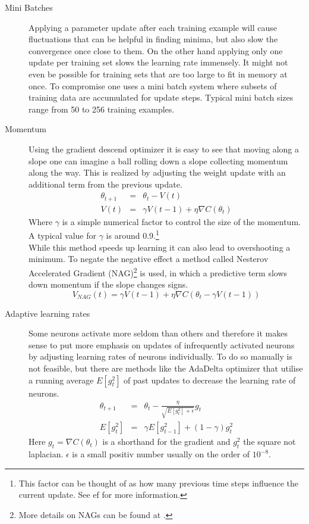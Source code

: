 				\begin{description}
					\item[Mini Batches] Applying a parameter update after each training example will cause fluctuations that can be helpful in finding minima, but also slow the convergence once close to them. On the other hand applying only one update per training set slows the learning rate immensely. It might not even be possible for training sets that are too large to fit in memory at once. To compromise one uses a mini batch system where subsets of training data are accumulated for update steps. Typical mini batch sizes range from 50 to 256 training examples.
					\item[Momentum] Using the gradient descend optimizer it is easy to see that moving along a slope one can imagine a ball rolling down a slope collecting momentum along the way. This is realized by adjusting the weight update with an additional term from the previous update.
					\begin{eqnarray}
						\theta_{t+1} & = & \theta_t - V(t)\\
						V(t) & = & \gamma V(t-1)  + \eta \nabla C(\theta_{t})
					\end{eqnarray}
					Where $\gamma$ is a simple numerical factor to control the size of the momentum. A typical value for $\gamma$ is around $0.9$.\footnote{This factor can be thought of as how many previous time steps influence the current update. See \cite{NNSGD}ef  for more information.}\\
					While this method speeds up learning  it can also lead to overshooting a minimum. To negate the negative effect a method called Nesterov Accelerated Gradient (NAG)\footnote{More details on NAGs can be found at \cite{NNNAG}.} is used, in which a predictive term slows down momentum if the slope changes signs.
					\begin{equation}
						V_{NAG}(t) = \gamma V(t-1) + \eta \nabla C( \theta_t - \gamma V(t-1))
					\end{equation} 
					\item[Adaptive learning rates] Some neurons activate more seldom than others and therefore it makes sense to put more emphasis on updates of infrequently activated neurons by adjusting learning rates of neurons individually. To do so manually is not feasible, but there are methods like the AdaDelta optimizer that utilise a running average $E[g^2_t]$ of past updates to decrease the learning rate of neurons.
					\begin{eqnarray}
					\theta_{t+1} & = & \theta_t - \frac{\eta}{\sqrt{E[g^2_t]+\epsilon}}g_t \\
					E[g^2_t] & = & \gamma E[g^2_{t-1}] + (1-\gamma) g^2_t
					\end{eqnarray}
					Here $g_t = \nabla C(\theta_t)$ is a shorthand for the gradient and $g^2_t$ the square not laplacian. $\epsilon$ is a small positiv number usually on the order of $10^{-8}$.
				\end{description}
